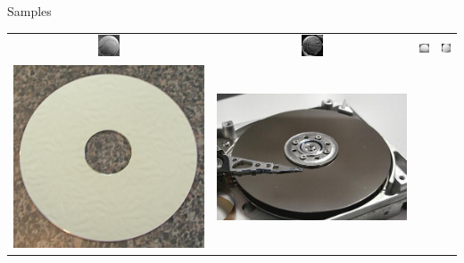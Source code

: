 \documentclass{beamer}
\begin{document}
\begin{frame}{Samples}
\begin{table}[H]
\begin{tabularx}{\textwidth}{@{}cccc@{}}
			\includegraphics[height=\samplesheight]{training_images/positive/n02799071_17616.thumbnail.jpg} &
			\includegraphics[height=\samplesheight]{training_images/positive/n02802426_6256.thumbnail.jpg} &
			\includegraphics[height=\samplesheight]{training_images/positive/n03145719_8658.thumbnail.jpg} &
			\includegraphics[height=\samplesheight]{training_images/positive/n04409515_2793.thumbnail.jpg} \\
			\includegraphics[height=\samplesheight]{training_images/hard_negative/n03208556_9694} &
			\includegraphics[height=\samplesheight]{training_images/hard_negative/n03208556_11973} &

\end{tabularx}
\end{table}
\end{frame}
\end{document}
